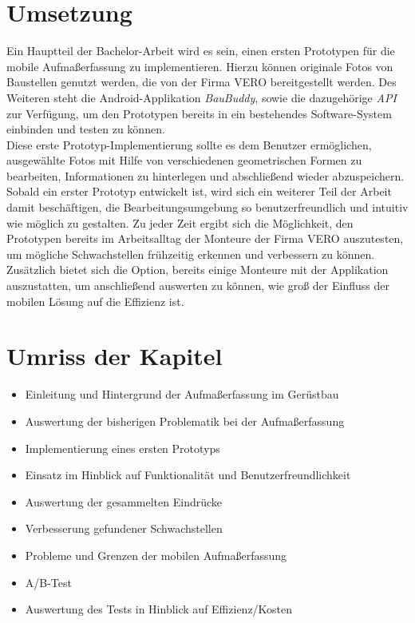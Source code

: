 \documentclass[a4paper]{article}
\newcommand{\vero}{\textsc{VERO}}
\begin{document}
\section*{Umsetzung}
Ein Hauptteil der Bachelor-Arbeit wird es sein, einen ersten Prototypen für die mobile Aufmaßerfassung zu implementieren.
Hierzu können originale Fotos von Baustellen genutzt werden, die von der Firma \vero{} bereitgestellt werden.
Des Weiteren steht die Android-Applikation \textit{BauBuddy}, sowie die dazugehörige \textit{API} zur Verfügung, um den Prototypen bereits in ein bestehendes Software-System einbinden und testen zu können. \\
Diese erste Prototyp-Implementierung sollte es dem Benutzer ermöglichen, ausgewählte Fotos mit Hilfe von verschiedenen geometrischen Formen zu bearbeiten, Informationen zu hinterlegen und abschließend wieder abzuspeichern.
Sobald ein erster Prototyp entwickelt ist, wird sich ein weiterer Teil der Arbeit damit beschäftigen, die Bearbeitungsumgebung so benutzerfreundlich und intuitiv wie möglich zu gestalten.
Zu jeder Zeit ergibt sich die Möglichkeit, den Prototypen bereits im Arbeitsalltag der Monteure der Firma \vero{} auszutesten, um mögliche Schwachstellen frühzeitig erkennen und verbessern zu können.
Zusätzlich bietet sich die Option, bereits einige Monteure mit der Applikation auszustatten, um anschließend auswerten zu können, wie groß der Einfluss der mobilen Lösung auf die Effizienz ist.

\section*{Umriss der Kapitel}
\begin{itemize}
	\item Einleitung und Hintergrund der Aufmaßerfassung im Gerüstbau
	\item Auswertung der bisherigen Problematik bei der Aufmaßerfassung
	\item Implementierung eines ersten Prototyps
	\item Einsatz im Hinblick auf Funktionalität und Benutzerfreundlichkeit
	\item Auswertung der gesammelten Eindrücke
	\item Verbesserung gefundener Schwachstellen
	\item Probleme und Grenzen der mobilen Aufmaßerfassung
	\item A/B-Test
	\item Auswertung des Tests in Hinblick auf Effizienz/Kosten
\end{itemize}
\end{document}
